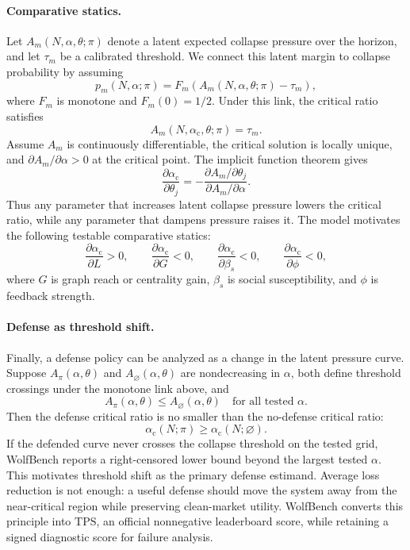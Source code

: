 \documentclass[letterpaper]{article} %
\newcommand{\alphac}{\alpha_{\mathrm{c}}}
\newcommand{\tps}{\mathrm{TPS}}
\begin{document}
\paragraph{Comparative statics.}
Let \(A_m(N,\alpha,\theta;\pi)\) denote a latent expected collapse pressure over
the horizon, and let \(\tau_m\) be a calibrated threshold. We connect this
latent margin to collapse probability by assuming
\[
    p_m(N,\alpha;\pi)
    =
    F_m(A_m(N,\alpha,\theta;\pi)-\tau_m),
\]
where \(F_m\) is monotone and \(F_m(0)=1/2\). Under this link, the critical
ratio satisfies
\[
    A_m(N,\alphac,\theta;\pi)=\tau_m.
\]
Assume \(A_m\) is continuously differentiable, the critical solution is locally
unique, and \(\partial A_m/\partial \alpha>0\) at the critical point. The
implicit function theorem gives
\[
    \frac{\partial \alphac}{\partial \theta_j}
    =
    -\frac{\partial A_m/\partial \theta_j}
    {\partial A_m/\partial \alpha}.
\]
Thus any parameter that increases latent collapse pressure lowers the critical
ratio, while any parameter that dampens pressure raises it. The model motivates
the following testable comparative statics:
\[
    \frac{\partial \alphac}{\partial L}>0,\qquad
    \frac{\partial \alphac}{\partial G}<0,\qquad
    \frac{\partial \alphac}{\partial \beta_s}<0,\qquad
    \frac{\partial \alphac}{\partial \phi}<0,
\]
where \(G\) is graph reach or centrality gain, \(\beta_s\) is social
susceptibility, and \(\phi\) is feedback strength.

\paragraph{Defense as threshold shift.}
Finally, a defense policy can be analyzed as a change in the latent pressure
curve. Suppose \(A_\pi(\alpha,\theta)\) and \(A_{\varnothing}(\alpha,\theta)\)
are nondecreasing in \(\alpha\), both define threshold crossings under the
monotone link above, and
\[
    A_\pi(\alpha,\theta)\leq A_{\varnothing}(\alpha,\theta)
    \quad\text{for all tested }\alpha .
\]
Then the defense critical ratio is no smaller than the no-defense critical
ratio:
\[
    \alphac(N;\pi)\geq \alphac(N;\varnothing).
\]
If the defended curve never crosses the collapse threshold on the tested grid,
WolfBench reports a right-censored lower bound beyond the largest tested
\(\alpha\). This motivates threshold shift as the primary defense estimand.
Average loss reduction is not enough: a useful defense should move the system
away from the near-critical region while preserving clean-market utility.
WolfBench converts this principle into \(\tps\), an official nonnegative
leaderboard score, while retaining a signed diagnostic score for failure
analysis.
\end{document}
